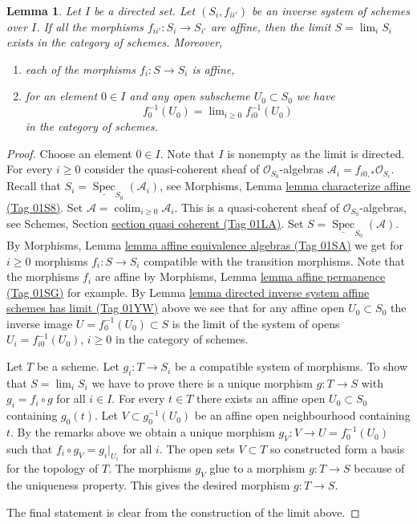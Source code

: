\documentclass{amsart}
\theoremstyle{plain}
\newtheorem{lemma}[subsection]{Lemma}
\theoremstyle{definition}
\theoremstyle{remark}
\numberwithin{equation}{subsection}
\def\lim{\mathop{\mathrm{lim}}\nolimits}
\def\colim{\mathop{\mathrm{colim}}\nolimits}
\def\Spec{\mathop{\mathrm{Spec}}}
\begin{document}
\begin{lemma}
\label{lemma-directed-inverse-system-has-limit}
Let $I$ be a directed set. Let $(S_i, f_{ii'})$ be an
inverse system of schemes over $I$. If all the morphisms
$f_{ii'} : S_i \to S_{i'}$ are affine, then the limit $S = \lim_i S_i$ exists
in the category of schemes. Moreover,
\begin{enumerate}
\item each of the morphisms $f_i : S \to S_i$ is affine,
\item for an element $0 \in I$ and any open subscheme $U_0 \subset S_0$
we have
$$
f_0^{-1}(U_0) = \lim_{i \geq 0} f_{i0}^{-1}(U_0)
$$
in the category of schemes.
\end{enumerate}
\end{lemma}

\begin{proof}
Choose an element $0 \in I$. Note that $I$ is nonempty as the limit is
directed. For every $i \geq 0$ consider the quasi-coherent sheaf of
$\mathcal{O}_{S_0}$-algebras $\mathcal{A}_i = f_{i0, *}\mathcal{O}_{S_i}$.
Recall that $S_i = \underline{\Spec}_{S_0}(\mathcal{A}_i)$,
see Morphisms, Lemma \href{https://stacks.math.columbia.edu/tag/01S8}{lemma characterize affine (Tag 01S8)}.
Set $\mathcal{A} = \colim_{i \geq 0} \mathcal{A}_i$.
This is a quasi-coherent sheaf of $\mathcal{O}_{S_0}$-algebras,
see Schemes, Section \href{https://stacks.math.columbia.edu/tag/01LA}{section quasi coherent (Tag 01LA)}.
Set $S = \underline{\Spec}_{S_0}(\mathcal{A})$.
By Morphisms, Lemma \href{https://stacks.math.columbia.edu/tag/01SA}{lemma affine equivalence algebras (Tag 01SA)}
we get for $i \geq 0$ morphisms $f_i : S \to S_i$ compatible with
the transition morphisms. Note that the morphisms $f_i$ are
affine by Morphisms, Lemma \href{https://stacks.math.columbia.edu/tag/01SG}{lemma affine permanence (Tag 01SG)} for example.
By Lemma \href{https://stacks.math.columbia.edu/tag/01YW}{lemma directed inverse system affine schemes has limit (Tag 01YW)} above
we see that for any affine open $U_0 \subset S_0$ the
inverse image $U = f_0^{-1}(U_0) \subset S$ is the limit of the
system of opens $U_i = f_{i0}^{-1}(U_0)$, $i \geq 0$ in the
category of schemes.

\medskip\noindent
Let $T$ be a scheme. Let $g_i : T \to S_i$ be a compatible system
of morphisms. To show that $S = \lim_i S_i$ we have
to prove there is a unique morphism $g : T \to S$ with
$g_i = f_i \circ g$ for all $i \in I$.
For every $t \in T$ there exists an affine open
$U_0 \subset S_0$ containing $g_0(t)$. Let $V \subset g_0^{-1}(U_0)$
be an affine open neighbourhood containing $t$.
By the remarks above we obtain a unique morphism
$g_V : V \to U = f_0^{-1}(U_0)$ such that $f_i \circ g_V = g_i|_{U_i}$
for all $i$. The open sets $V \subset T$ so constructed form
a basis for the topology of $T$. The morphisms $g_V$ glue to a morphism
$g : T \to S$ because of the uniqueness property. This gives the
desired morphism $g : T \to S$.

\medskip\noindent
The final statement is clear from the construction of the limit above.
\end{proof}
\end{document}
